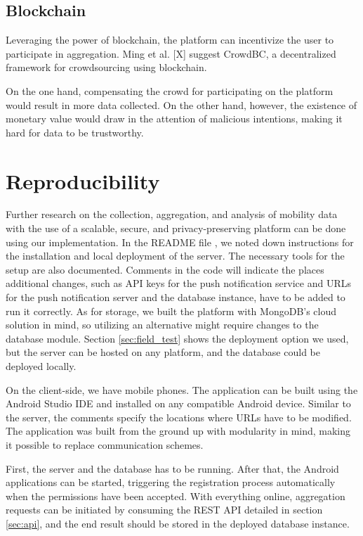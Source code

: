 \subsection{Blockchain}
Leveraging the power of blockchain, the platform can incentivize the user to participate in aggregation. Ming et al. [X] suggest CrowdBC, a decentralized framework for crowdsourcing using blockchain. 

On the one hand, compensating the crowd for participating on the platform would result in more data collected. On the other hand, however, the existence of monetary value would draw in the attention of malicious intentions, making it hard for data to be trustworthy.

\section{Reproducibility}
Further research on the collection, aggregation, and analysis of mobility data with the use of a scalable, secure, and privacy-preserving platform can be done using our implementation. In the README file
, we noted down instructions for the installation and local deployment of the server. The necessary tools for the setup are also documented. Comments in the code will indicate the places additional changes, such as API keys for the push notification service and URLs for the push notification server and the database instance, have to be added to run it correctly. As for storage, we built the platform with MongoDB's cloud solution in mind, so utilizing an alternative might require changes to the database module. Section \ref{sec:field_test} shows the deployment option we used, but the server can be hosted on any platform, and the database could be deployed locally.

On the client-side, we have mobile phones. The application can be built using the Android Studio IDE and installed on any compatible Android device. Similar to the server, the comments specify the locations where URLs have to be modified. The application was built from the ground up with modularity in mind, making it possible to replace communication schemes.

First, the server and the database has to be running. After that, the Android applications can be started, triggering the registration process automatically when the permissions have been accepted. With everything online, aggregation requests can be initiated by consuming the REST API detailed in section \ref{sec:api}, and the end result should be stored in the deployed database instance.
